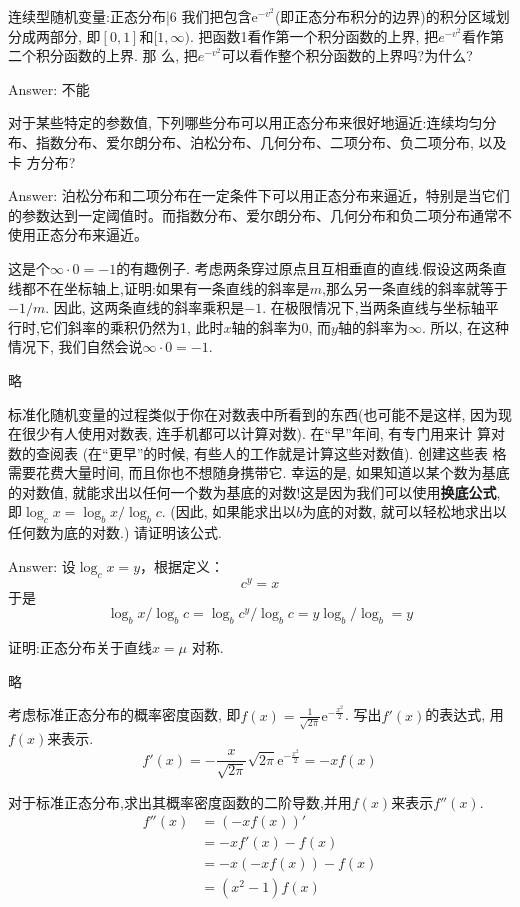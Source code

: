 \newChapter 连续型随机变量:正态分布|6
\exer 我们把包含$\mathrm{e}^{-v^2}$(即正态分布积分的边界)的积分区域划分成两部分, 即$[0, 1]$和$[1, \infty)$. 把函数1看作第一个积分函数的上界, 把$e^{-v^2}$看作第二个积分函数的上界. 那 么, 把$e^{-v^2}$可以看作整个积分函数的上界吗?为什么?\par
Answer: 不能

\exer 对于某些特定的参数值, 下列哪些分布可以用正态分布来很好地逼近:连续均匀分布、指数分布、爱尔朗分布、泊松分布、几何分布、二项分布、负二项分布, 以及卡 方分布?\par
Answer: 泊松分布和二项分布在一定条件下可以用正态分布来逼近，特别是当它们的参数达到一定阈值时。而指数分布、爱尔朗分布、几何分布和负二项分布通常不使用正态分布来逼近。

这是个$\infty\cdot 0 = -1$的有趣例子. 考虑两条穿过原点且互相垂直的直线.假设这两条直线都不在坐标轴上,证明:如果有一条直线的斜率是$m$,那么另一条直线的斜率就等于$-1/m$. 因此, 这两条直线的斜率乘积是$-1$. 在极限情况下,当两条直线与坐标轴平行时,它们斜率的乘积仍然为1, 此时$x$轴的斜率为0, 而$y$轴的斜率为$\infty$. 所以, 在这种情况下, 我们自然会说$\infty \cdot0 = -1$.\par
略

\exer 标准化随机变量的过程类似于你在对数表中所看到的东西(也可能不是这样, 因为现在很少有人使用对数表, 连手机都可以计算对数). 在“早”年间, 有专门用来计 算对数的查阅表 (在“更早”的时候, 有些人的工作就是计算这些对数值). 创建这些表 格需要花费大量时间, 而且你也不想随身携带它. 幸运的是, 如果知道以某个数为基底 的对数值, 就能求出以任何一个数为基底的对数!这是因为我们可以使用{\bf 换底公式}, 即$\log_c x = \log_b x/ \log_b c$. (因此, 如果能求出以$b$为底的对数, 就可以轻松地求出以任何数为底的对数.) 请证明该公式.\par
Answer: 设$\log_c x=y$，根据定义：
\[c^y=x\]
于是
\[\log_b x/ \log_b c = \log_b c^y/ \log_b c=y\log_b/\log_b=y\]

\exer 证明:正态分布关于直线$x = \mu$ 对称.\par
略

\exer 考虑标准正态分布的概率密度函数, 即$f(x) =\frac{1}{\sqrt{2\pi}}\mathrm{e}^{-\frac{x^2}{2}}$. 写出$f'(x)$的表达式, 用$f(x)$来表示.
\[f'(x) =-\frac{x}{\sqrt{2\pi}}{\sqrt{2\pi}}\mathrm{e}^{-\frac{x^2}{2}}= -xf(x)\]

\exer 对于标准正态分布,求出其概率密度函数的二阶导数,并用$f(x)$来表示$f''(x)$.
\begin{align*}
f''(x) &=(-xf(x))' \\
&=-xf'(x) - f(x) \\
&=-x(-xf(x)) - f(x) \\
&=(x^2-1)f(x)
\end{align*}

